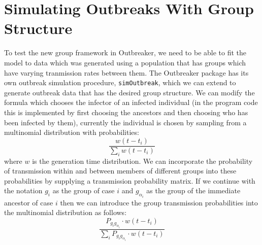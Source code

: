 \documentclass[11pt,a4paper]{report}
\begin{document}
\section{Simulating Outbreaks With Group Structure}
To test the new group framework in Outbreaker, we need to be able to fit the model to data which was generated using a population that has groups which have varying tranmission rates between them.
The Outbreaker package has its own outbreak simulation procedure, {\tt simOutbreak}, which we can extend to generate outbreak data that has the desired group structure. We can modify the formula which chooses the infector of an infected individual (in the program code this is implemented by first choosing the ancestors and then choosing who has been infected by them), currently the individual is chosen by sampling from a multinomial distribution with probabilities:
\[ \frac{w(t-t_i)}{\sum_i{w(t-t_i)}} \]
where $w$ is the generation time distribution. We can incorporate the probability of transmission within and between members of different groups into these probabilities by supplying a transmission probability matrix. If we continue with the notation $g_{i}$ as the group of case $i$ and $g_{\alpha_{i}}$ as the group of the immediate ancestor of case $i$ then we can introduce the group transmission probabilities into the multinomial distribution as follows:
\[ \frac{P_{g_{i}g_{\alpha_{i}}} \cdot w(t-t_i)}{\sum_i{P_{g_{i}g_{\alpha_{i}}} \cdot w(t-t_i)}}\]
\end{document}
